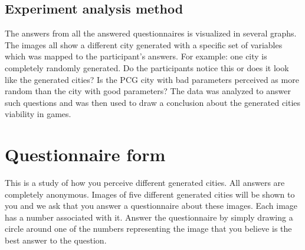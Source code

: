 	\subsection{Experiment analysis method}
	The answers from all the answered questionnaires is visualized in several graphs. The images all show a different city generated with a specific set of variables which was mapped to the participant's answers. For example: one city is completely randomly generated. Do the participants notice this or does it look like the generated cities? Is the PCG city with bad parameters perceived as more random than the city with good parameters? The data was analyzed to answer such questions and was then used to draw a conclusion about the generated cities viability in games.
			
	\section{Questionnaire form} \label{ssssec:questionnaire}
	This is a study of how you perceive different generated cities. All answers are completely anonymous. Images of five different generated cities will be shown to you and we ask that you answer a questionnaire about these images. Each image has a number associated with it. Answer the questionnaire by simply drawing a circle around one of the numbers representing the image that you believe is the best answer to the question.
			
